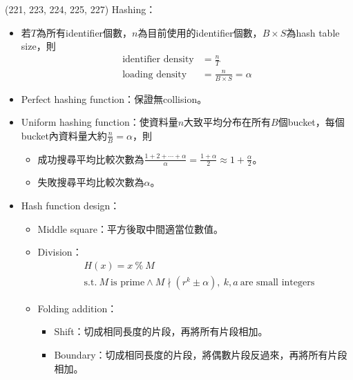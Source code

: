 \item \begin{theorem}{(221, 223, 224, 225, 227)} Hashing： \begin{itemize}
        \item 若$T$為所有identifier個數，$n$為目前使用的identifier個數，$B \times S$為hash table size，則\begin{equation}
            \begin{aligned}
                \text{identifier density} & = \frac{n}{T} \\
                \text{loading density} & = \frac{n}{B \times S} = \alpha
            \end{aligned}
        \end{equation}
        \item Perfect hashing function：保證無collision。
        \item Uniform hashing function：使資料量$n$大致平均分布在所有$B$個bucket，每個bucket內資料量大約$\frac{n}{B} = \alpha$，則\begin{itemize}
            \item 成功搜尋平均比較次數為$\frac{1 + 2 + \cdots + \alpha}{\alpha} = \frac{1 + \alpha}{2} \approx 1 + \frac{\alpha}{2}$。
            \item 失敗搜尋平均比較次數為$\alpha$。
        \end{itemize}
        \item Hash function design：\begin{itemize}
            \item Middle square：平方後取中間適當位數值。
            \item Division：\begin{equation}
                \begin{aligned}
                    & H(x) = x \ \% \ M \\
                    & \text{s.t.} \ M \ \text{is prime} \land M \nmid (r^k \pm \alpha), \ k, a \ \text{are small integers}
                \end{aligned}
            \end{equation}
            \item Folding addition：\begin{itemize}
                \item Shift：切成相同長度的片段，再將所有片段相加。
                \item Boundary：切成相同長度的片段，將偶數片段反過來，再將所有片段相加。
            \end{itemize}

\end{itemize}
\end{itemize}
\end{theorem}
